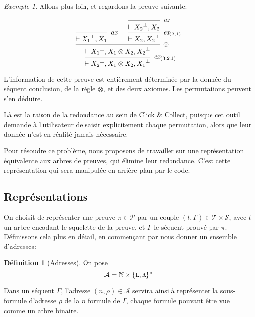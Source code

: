\documentclass[11pt,a4paper]{article}
\theoremstyle{plain}
\theoremstyle{definition}
\newtheorem{definition}{Définition}
\theoremstyle{remark}
\newtheorem{example}{Exemple}
\newcommand*{\orth}{^\perp}
\newcommand*{\tensor}{\otimes}
\newcommand*{\axv}[1]{\infer{0}[\ensuremath{\mathit{ax}}]{\vdash #1}}
\newcommand*{\tensorv}[1]{\infer{2}[\ensuremath{\tensor}]{\vdash #1}}
\newcommand*{\permv}[2]{\infer{1}[\ensuremath{\textit{ex}_{#1}}]{\vdash #2}}
\newcommand*{\someproof}{\pi}
\newcommand*{\sequent}{\Gamma}
\newcommand*{\Left}{\textnormal{\texttt{L}}}
\newcommand*{\Right}{\textnormal{\texttt{R}}}
\newcommand*{\sequents}{\ensuremath{\mathcal{S}}}
\newcommand*{\trees}{\ensuremath{\mathcal{T}}}
\newcommand*{\representationslarge}{\ensuremath{\trees \times \sequents}}
\begin{document}
\begin{example}
    Allons plus loin, et regardons la preuve suivante:

    \begin{equation*}
        \begin{prooftree}
            \axv{{X_1}\orth, X_1}
            \axv{{X_2}\orth, X_2}
            \permv{(2, 1)}{X_2, {X_2}\orth}
            \tensorv{{X_1}\orth, X_1 \tensor X_2, {X_2}\orth}
            \permv{(3, 2, 1)}{{X_2}\orth, X_1 \tensor X_2, {X_1}\orth}
        \end{prooftree}
    \end{equation*}
    

    L'information de cette preuve est entièrement déterminée par la donnée du séquent conclusion, de la règle $\tensor$, et des deux axiomes. Les permutations peuvent s'en déduire.
\end{example}

Là est la raison de la redondance au sein de Click \& Collect, puisque cet outil demande à l'utilisateur de saisir explicitement chaque permutation, alors que leur donnée n'est en réalité jamais nécessaire.

Pour résoudre ce problème, nous proposons de travailler sur une représentation équivalente aux arbres de preuves, qui élimine leur redondance. C'est cette représentation qui sera manipulée en arrière-plan par le code.

\subsection{Représentations}
On choisit de représenter une preuve $\someproof \in \mathcal{P}$ par un couple $(t, \sequent) \in \representationslarge$, avec $t$ un arbre encodant le squelette de la preuve, et $\sequent$ le séquent prouvé par $\someproof$. Définissons cela plus en détail, en commençant par nous donner un ensemble d'adresses:

\begin{definition}[Adresses]
On pose
\begin{equation*}
\mathcal{A} = \mathbb{N} \times \{ \Left, \Right\}^{*}  
\end{equation*}

Dans un séquent $\sequent$, l'adresse $(n, \rho) \in \mathcal{A}$ servira ainsi à représenter la sous-formule d'adresse $\rho$ de la $n$\ieme{} formule de $\sequent$, chaque formule pouvant être vue comme un arbre binaire.
\end{definition}
\end{document}
